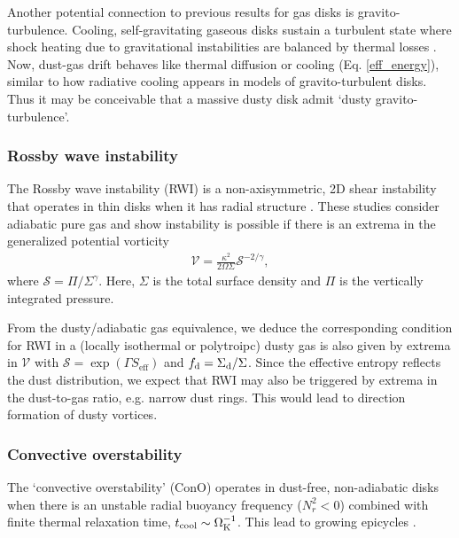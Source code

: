 Another potential connection to previous results for gas disks is  
gravito-turbulence. Cooling, self-gravitating gaseous disks 
sustain a turbulent state where shock heating due to gravitational 
instabilities are balanced by thermal losses
\citep{gammie01}. Now, dust-gas drift behaves like thermal diffusion
or cooling (Eq. \ref{eff_energy}), similar to how radiative cooling 
appears in models of gravito-turbulent disks. Thus it may be
conceivable that a massive dusty disk admit `dusty
gravito-turbulence'. 






\subsubsection{Rossby wave instability}
The Rossby wave instability (RWI) is a non-axisymmetric, 2D shear
instability that operates in thin disks when it has radial structure
\citep{lovelace99,li00}. These studies consider adiabatic pure gas and 
show instability is possible if there is an extrema in the generalized
potential vorticity 
\begin{align}
 \mathcal{V} = \frac{\kappa^2}{2\Omega\Sigma}\mathcal{S}^{-2/\gamma},  
\end{align} 
where $\mathcal{S} = \Pi/\Sigma^\gamma$. Here, $\Sigma$ is the total
surface density and $\Pi$ is the vertically integrated pressure. 

From the dusty/adiabatic gas equivalence, we deduce the corresponding
condition for RWI in a (locally isothermal or polytroipc) dusty gas is
also given by extrema in $\mathcal{V}$ with $\mathcal{S} = \exp{\left(\Gamma
S_\mathrm{eff}\right)}$ and $f_\mathrm{d} = \Sigma_\mathrm{d}/\Sigma$. Since
the effective entropy reflects the dust distribution, we expect that
RWI may also be triggered by extrema in the dust-to-gas ratio, e.g. 
narrow dust rings. This would lead to direction formation of dusty
vortices. 



\subsubsection{Convective overstability}
The `convective overstability' (ConO) operates in dust-free, non-adiabatic disks 
when there is an unstable radial buoyancy frequency ($N_r^2 < 0 $)
combined with finite thermal relaxation time, $t_\mathrm{cool}\sim
\Omega_{\rm K}^{-1}$. This lead to growing epicycles
\citep{klahr14,lyra14,latter16}.  

